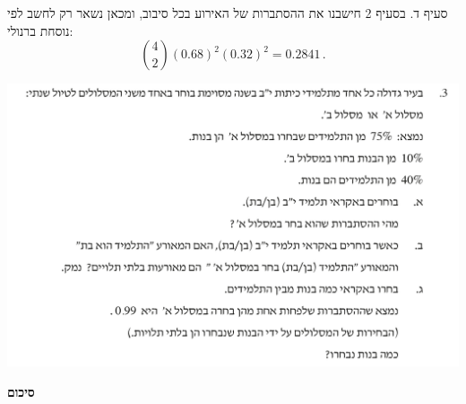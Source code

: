 \documentclass[12pt,a4paper]{article}
\begin{document}
סעיף ד. בסעיף 2 חישבנו את ההסתברות של האירוע בכל סיבוב, ומכאן נשאר רק לחשב לפי נוסחת ברנולי:
\[
{4\choose 2}(0.68)^2 (0.32)^2= 0.2841\,.
\]


\textbf{}

\begin{center}
\includegraphics[width=.95\textwidth]{summer-2014b-3}
\end{center}



\newpage

\begin{center}
\textbf{סיכום}
\end{center}
\end{document}

